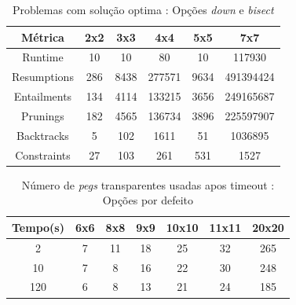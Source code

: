 \documentclass{llncs}
\begin{document}
\setlength{\tabcolsep}{12pt}
\begin{table}[ht] 
\caption{Problemas com solu\c{c}\~{a}o optima : Op\c{c}\~{o}es \emph{down} e \emph{bisect}} %
\centering %
\begin{tabular}{c c c c c c} %
\hline\hline %

M\'{e}trica & 2x2 & 3x3 & 4x4 & 5x5 & 7x7\\ [0.5ex] %
\hline %
Runtime & 10 & 10 & 80 & 10 & 117930 \\
Resumptions & 286 & 8438 & 277571 & 9634 & 491394424 \\
Entailments & 134 & 4114 & 133215 & 3656 & 249165687 \\
Prunings & 182 & 4565 & 136734 & 3896 & 225597907 \\
Backtracks & 5 & 102 & 1611 & 51 & 1036895 \\
Constraints & 27 & 103 & 261 & 531 & 1527 \\[1 ex]
\hline %
\end{tabular} 
\label{tabela:4} %
\end{table}





\setlength{\tabcolsep}{12pt}
\begin{table}[ht] 
\caption{N\'{u}mero de \emph{pegs} transparentes usadas apos timeout : Op\c{c}\~{o}es por defeito} %
\centering %
\begin{tabular}{c c c c c c c} %
\hline\hline %

Tempo(s) & 6x6 & 8x8 & 9x9 & 10x10 & 11x11 & 20x20\\ [0.5ex] %
\hline %
2 & 7 & 11 & 18 & 25 & 32 & 265 \\
10 & 7 & 8 & 16 & 22 & 30 & 248 \\
120 & 6 & 8 & 13 & 21 & 24 & 185 \\[1 ex]
\hline %
\end{tabular} 
\label{tabela:5} %
\end{table}
\end{document}
